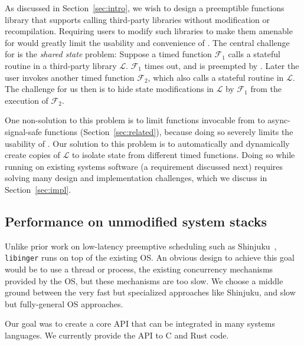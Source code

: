 As discussed in Section~\ref{sec:intro}, we wish to design a preemptible
functions library that supports calling third-party libraries without
modification or recompilation. Requiring users to modify such libraries to make
them amenable for \libinger{} would greatly limit the usability and convenience
of \libinger{}. The central challenge for \libinger{} is the \emph{shared
state} problem: Suppose a timed function $\mathcal{F_1}$ calls a stateful
routine in a third-party library $\mathcal{L}$. $\mathcal{F_1}$ times out, and
is preempted by \libinger{}. Later the user invokes another timed function
$\mathcal{F_2}$, which also calls a stateful routine in $\mathcal{L}$. The
challenge for us then is to hide state modifications in $\mathcal{L}$ by
$\mathcal{F_1}$ from the execution of $\mathcal{F_2}$.

One non-solution to this problem is to limit functions invocable from
\libinger{} to async-signal-safe functions (Section~\ref{sec:related}), because
doing so severely limits the usability of \libinger{}. Our solution to this
problem is to automatically and dynamically create copies of $\mathcal{L}$ to
isolate state from different timed functions. Doing so while running on
existing systems software (a requirement discussed next) requires solving many
design and implementation challenges, which we discuss in
Section~\ref{sec:impl}.


\subsection{Performance on unmodified system stacks}

Unlike prior work on low-latency preemptive scheduling such as
Shinjuku~\cite{Kaffes:nsdi2019}, \texttt{libinger} runs on top of the existing
OS. An obvious design to achieve this goal would be to use a thread or process,
the existing concurrency mechanisms provided by the OS, but these mechanisms
are too slow. We choose a middle ground between the very fast but specialized
approaches like Shinjuku, and slow but fully-general OS approaches.

Our goal was to create a core \libinger{} API that can be integrated in many
systems languages. We currently provide the \libinger{} API to C and Rust code.



